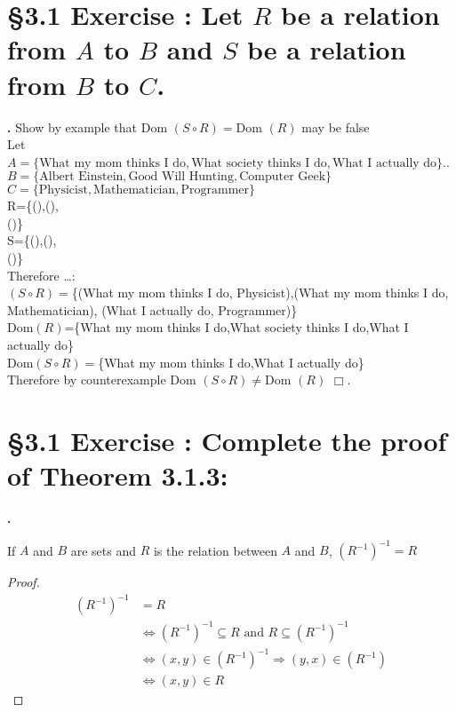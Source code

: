 \documentclass[a4paper,11pt]{article}
\begin{document}
{{\section*{\S 3.1 Exercise : Let \(R\) be a relation from \(A\) to \(B\) and \(S\) be a relation from \(B\) to \(C\).}
\setcounter{SubsectionCounter}{2}
\noindent\textbf{.}
Show by example that Dom \({(S \circ R)} = \text{Dom } {(R)}\) may be false\\
Let \(A=\{\text{What my mom thinks I do},\text{What society thinks I do},\text{What I actually 
do}\}\)..\\
\(B=\{\text{Albert Einstein},\text{Good Will Hunting},\text{Computer Geek}\}\)\\
\(C=\{\text{Physicist},\text{Mathematician},\text{Programmer}\}\)\\
R=\{{()},{()},\\{()}\}\\
S=\{{()},{()},\\{()}\}\\
Therefore \ldots:\\
\({(S \circ R)}=\)\{(What my mom thinks I do, Physicist),(What my mom thinks I do, Mathematician), (What I actually do, 
Programmer)\}\\
Dom\({(R)}\)=\{What my mom thinks I do,What society thinks I do,What I actually 
do\}\\
Dom\({(S \circ R)}=\)\{What my mom thinks I do,What I actually 
do\}\\
Therefore by counterexample Dom \({(S \circ R)} \neq \text{Dom } {(R)}\) \(\Box\).
\newpage

\setcounter{ProblemCounter}{10}
\section*{\S 3.1 Exercise : Complete the proof of Theorem 3.1.3:}
\setcounter{SubsectionCounter}{1}
\textbf{.}
\begin{theorem1}
If \(A\) and \(B\) are sets and \(R\) is the relation between \(A\) and \(B\), \({({R^{-1}})}^{-1}=R\)
\begin{proof}
\begin{align*}
{(R^{-1})}^{-1} &= R\\
&\Leftrightarrow {(R^{-1})}^{-1} \subseteq R \text{ and } R \subseteq {(R^{-1})}^{-1}\\
&\Leftrightarrow (x,y) \in {(R^{-1})}^{-1} \Rightarrow {(y,x)}\in {({R^{-1}})}\\
&\Leftrightarrow (x,y) \in R
\end{align*}
\end{proof}  
\end{theorem1}
\newpage
\setcounter{SubsectionCounter}{4}
}}
\end{document}
